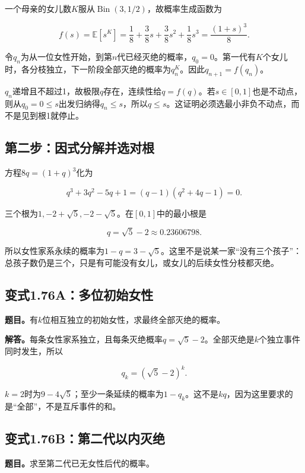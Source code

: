 \documentclass[
  11pt,a4paper,UTF8,fontset=fandol]{ctexart}
\begin{document}
一个母亲的女儿数\(K\)服从\(\operatorname{Bin}(3,1/2)\)，故概率生成函数为

\[f(s)=\mathbb E[s^K]=\frac18+\frac38s+\frac38s^2+\frac18s^3=\frac{(1+s)^3}{8}.\]

令\(q_n\)为从一位女性开始，到第\(n\)代已经灭绝的概率，\(q_0=0\)。第一代有\(K\)个女儿时，各分枝独立，下一阶段全部灭绝的概率为\(q_n^K\)。因此\(q_{n+1}=f(q_n)\)。

\(q_n\)递增且不超过1，故极限\(q\)存在，连续性给\(q=f(q)\)。若\(s\in[0,1]\)也是不动点，则从\(q_0=0\le s\)出发归纳得\(q_n\le s\)，所以\(q\le s\)。这证明必须选最小非负不动点，而不是见到根1就停止。

\subsection{第二步：因式分解并选对根}\label{ux7b2cux4e8cux6b65ux56e0ux5f0fux5206ux89e3ux5e76ux9009ux5bf9ux6839}

方程\(8q=(1+q)^3\)化为

\[q^3+3q^2-5q+1=(q-1)(q^2+4q-1)=0.\]

三个根为\(1,-2+\sqrt5,-2-\sqrt5\)。在\([0,1]\)中的最小根是

\[\boxed{q=\sqrt5-2\approx0.23606798.}\]

所以女性家系永续的概率为\(1-q=3-\sqrt5\)。这里不是说某一家``没有三个孩子''：总孩子数仍是三个，只是有可能没有女儿，或女儿的后续女性分枝都灭绝。

\subsection{变式1.76A：多位初始女性}\label{ux53d8ux5f0f1.76aux591aux4f4dux521dux59cbux5973ux6027}

\textbf{题目。}有\(k\)位相互独立的初始女性，求最终全部灭绝的概率。

\textbf{解答。}每条女性家系独立，且每条灭绝概率\(q=\sqrt5-2\)。全部灭绝是\(k\)个独立事件同时发生，所以

\[\boxed{q_k=(\sqrt5-2)^k.}\]

\(k=2\)时为\(9-4\sqrt5\)；至少一条延续的概率为\(1-q_k\)。这不是\(kq\)，因为这里要求的是``全部''，不是互斥事件的和。

\subsection{变式1.76B：第二代以内灭绝}\label{ux53d8ux5f0f1.76bux7b2cux4e8cux4ee3ux4ee5ux5185ux706dux7edd}

\textbf{题目。}求至第二代已无女性后代的概率。
\end{document}
